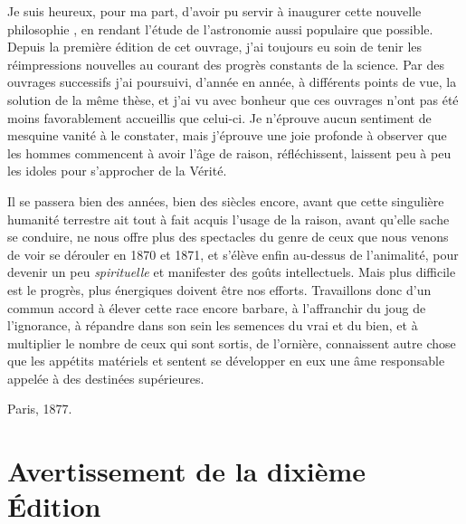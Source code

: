\documentclass[a4paper, 11pt, oneside]{article}
\begin{document}
Je suis heureux, pour ma part, d'avoir pu servir à inaugurer cette nouvelle philosophie , en rendant l'étude de l'astronomie aussi populaire que possible. Depuis la première édition de cet ouvrage, j'ai toujours eu soin de tenir les réimpressions nouvelles au courant des progrès constants de la science. Par des ouvrages successifs j'ai poursuivi, d'année en année, à différents points de vue, la solution de la même thèse, et j'ai vu avec bonheur que ces ouvrages n'ont pas été moins favorablement accueillis que celui-ci. Je n'éprouve aucun sentiment de mesquine vanité à le constater, mais j'éprouve une joie profonde à observer que les hommes commencent à avoir l'âge de raison, réfléchissent, laissent peu à peu les idoles pour s'approcher de la Vérité.

Il se passera bien des années, bien des siècles encore, avant que cette singulière humanité terrestre ait tout à fait acquis l'usage de la raison, avant qu'elle sache se conduire, ne nous offre plus des spectacles du genre de ceux que nous venons de voir se dérouler en 1870 et 1871, et s'élève enfin au-dessus de l'animalité, pour devenir un peu \emph{spirituelle} et manifester des goûts intellectuels. Mais plus difficile est le progrès, plus énergiques doivent être nos efforts. Travaillons donc d'un commun accord à élever cette race encore barbare, à l'affranchir du joug de l'ignorance, à répandre dans son sein les semences du vrai et du bien, et à multiplier le nombre de ceux qui sont sortis, de l'ornière, connaissent autre chose que les appétits matériels et sentent se développer en eux une âme responsable appelée à des destinées supérieures.

\bigskip

Paris, 1877.
\clearpage
\section*{Avertissement de la dixième Édition}
\end{document}
